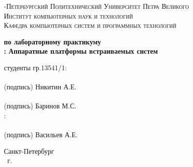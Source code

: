 \documentclass[14pt,a4paper,report]{report}
\begin{document}
\def\contentsname{Содержание}

\begin{titlepage}
	\begin{center}
		\textsc{-Петербургский Политехнический Университет Петра Великого\\[5mm]
Институт компьютерных наук и технологий\\[5mm]
Кафедра компьютерных систем и программных технологий\\[5mm]}
		
		\vfill
		
		\textbf{ по лабораторному практикуму\\[3mm]
			: Аппаратные платформы встраиваемых систем\\[15mm]
		}
	\end{center}
	
	\vfill
\begin{flushright}
	\begin{minipage}{.4\textwidth}
		{ студенты гр.13541/1:\\[2mm] 
		\underline{\hspace{2in}}\\ %
  		\centering
  		\small(подпись)
		Никитин А.Е.\\[5mm]
		
		\underline{\hspace{2in}}\\ %
  		\centering
 		 \small(подпись)
		Баринов М.С.\\[5mm]
				
		:\\[2mm] 
		\underline{\hspace{2in}}\\ %
  		\centering
 		 \small(подпись)
		Васильев А.Е.\\
		}
	\end{minipage}
\end{flushright}
	\vfill
	\begin{center}
		Санкт-Петербург\\ \the\year\ г.
	\end{center}
\end{titlepage}

\tableofcontents
\clearpage
\end{document}
